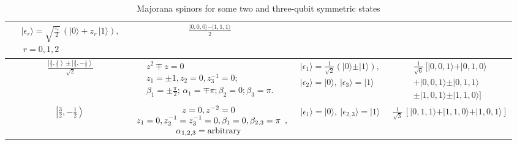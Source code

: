 \documentclass[pra,preprint,a4paper,superscriptaddress]{revtex4}
\begin{document}
{\begin{table}
{\begin{tabular}{|c c|c|c|c|}
& 
$\begin{array}{c}\vert \epsilon_{r}\rangle=
  \sqrt{\frac{z_r}{2}}\, \left(\vert0\rangle+z_r\, \vert 1\rangle\right),  \\ \ r=0,1,2\end{array}$
  & $\frac{\vert 0,0,0\rangle - \vert 1,1,1\rangle}{2}$
  \\ 
\hline
&  $\frac{\left\vert \frac{3}{2},\frac{1}{2}\right\rangle
\pm \left\vert \frac{3}{2},-\frac{1}{2}\right\rangle}{\sqrt{2}}$
& $\begin{array}{c} z^2\mp z=0\\  
z_{1}=\pm 1, z_2=0, z_3^{-1}=0;\\
\beta_{1}=\pm \frac{\pi}{2};\, \alpha_1=\mp\pi; \beta_{2}=0; \beta_3=\pi.\end{array}$
& $\begin{array}{c}\vert \epsilon_{1}\rangle=
  \frac{1}{\sqrt{2}}\left(\vert 0\rangle \pm \vert 1\rangle\right),  
 \\  \vert \epsilon_{2}\rangle=\vert 0\rangle, \ 
 \vert \epsilon_{3}\rangle=\vert 1\rangle\end{array} $ 
 & $\begin{array}{l}
\frac{1}{\sqrt{6}}\, [\vert 0,0,1\rangle+\vert 0,1,0\rangle \\ 
+\vert 0,0,1\rangle 
 \pm \vert 0,1,1\rangle\\ 
 \pm \vert 1,0,1\rangle\pm \vert 1,1,0\rangle]
 \end{array}$  \\       
  \hline
 &  $\left\vert \frac{3}{2}, -\frac{1}{2}\right\rangle$
& $\begin{array}{c} z=0, z^{-2}=0 \\
z_{1}=0,z_2^{-1}=z_3^{-1}=0,   \beta_{1}=0, \beta_{2,3}=\pi \\ \alpha_{1,2,3}={\rm arbitrary} \end{array}, $
& $\vert \epsilon_{1}\rangle=\vert0\rangle, \ \vert \epsilon_{2,3}\rangle=\vert 1\rangle$ 
 & $\frac{1}{\sqrt{3}}\, [\vert 0,1,1\rangle+\vert 1,1,0\rangle  
+\vert 1,0,1\rangle]$
 \\
 \hline        

\end{tabular}}
\caption{Majorana spinors for some two and three-qubit symmetric states}
\end{table}


}
\end{document}
